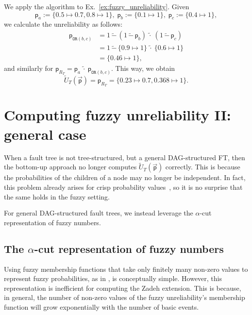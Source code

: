 \documentclass[runningheads]{llncs}
\begin{document}
\begin{example}\label{ex:fuzzy_unreliability_BU_calc}
    We apply the algorithm to Ex.~\ref{ex:fuzzy_unreliability}. Given 
    $$ \mathsf{p}_a :=  \{0.5 \mapsto 0.7, 0.8 \mapsto 1\}, \;
    \mathsf{p}_b :=  \{0.1 \mapsto 1\}, \;
    \mathsf{p}_c := \{0.4 \mapsto 1\}, $$
    we calculate the unreliability as follows:
    \begin{align*}
    \mathsf{p}_{\texttt{OR}(b,c)} &= 1\,\widetilde{-}\,(1\,\widetilde{-}\,\mathsf{p}_b)\:\tilde{\cdot}\:(1\,\widetilde{-}\,\mathsf{p}_c) \\
    &= 1\,\widetilde{-}\, \{0.9 \mapsto 1\} \:\tilde{\cdot}\: \{0.6 \mapsto 1\} \\
    &= \{0.46 \mapsto 1\},
    \end{align*}
    and similarly for $\mathsf{p}_{R_T}=\mathsf{p}_{a}\:\tilde{\cdot}\:\mathsf{p}_{\texttt{OR}(b,c)}$.
    This way, we obtain 
    $$\tilde{U}_T(\vec{\mathsf{p}}) = \mathsf{p}_{R_T}= \{0.23 \mapsto 0.7, 0.368 \mapsto 1\}.$$ 
\end{example}




\section{Computing fuzzy unreliability II: general case}\label{sec:DAG_FTs}

When a fault tree is not tree-structured, but a general DAG-structured FT, then the bottom-up approach no longer computes $\tilde{U}_T(\vec{\mathsf{p}})$ correctly. This is because the probabilities of the children of a node may no longer be independent. In fact, this problem already arises for crisp probability values~\cite{ruijters2015FTA}, so it is no surprise that the same holds in the fuzzy setting.

For general DAG-structured fault trees, we instead leverage the $\alpha$-cut representation of fuzzy numbers.


\subsection{The $\alpha$-cut representation of fuzzy numbers}\label{sec:alpha-cuts}

Using fuzzy membership functions that take only finitely many non-zero values to represent fuzzy probabilities, as in , is conceptually simple. 
However, this representation is inefficient for computing the Zadeh extension. This is because, in general, the number of non-zero values of the fuzzy unreliability's membership function will grow exponentially with the number of basic events.
\end{document}
